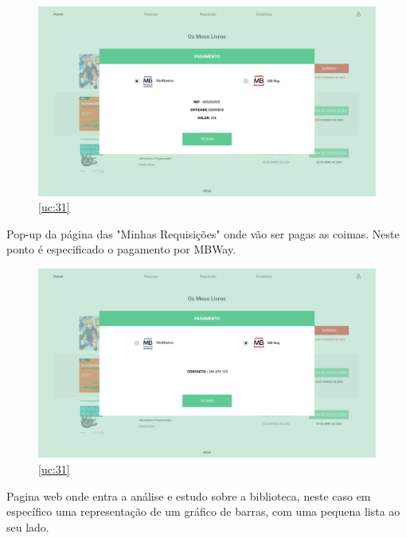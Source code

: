 \begin{figure}[H]
	\centering
	\includegraphics[width=1\linewidth]{../Mockups/PNGs/Pagamento de coimas Multibanco.png}  %
	\caption{\ref{uc:31}}
	\label{fig:chap230}
\end{figure}


\newpage

Pop-up da página das "Minhas Requisições" onde vão ser pagas as coimas. Neste ponto é especificado o pagamento por MBWay.


\begin{figure}[H]
	\centering
	\includegraphics[width=1\linewidth]{../Mockups/PNGs/Pagamento de coimas MBWay.png}  %
	\caption{\ref{uc:31}}
	\label{fig:chap230}
\end{figure}


\newpage

Pagina web onde entra a análise e estudo sobre a biblioteca, neste caso em específico uma representação de um gráfico de barras, com uma pequena lista ao seu lado.

